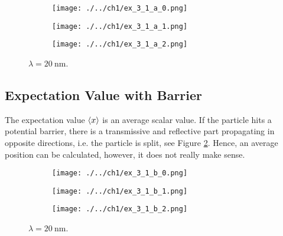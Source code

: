 \begin{figure}
	\centering
	\begin{subfigure}{1\linewidth}
		\texttt{[image: ./../ch1/ex\_3\_1\_a\_0.png]}
	\end{subfigure}
	
	\begin{subfigure}{1\linewidth}
		\texttt{[image: ./../ch1/ex\_3\_1\_a\_1.png]}
	\end{subfigure}
	
	\begin{subfigure}{1\linewidth}
		\texttt{[image: ./../ch1/ex\_3\_1\_a\_2.png]}
	\end{subfigure}
	
	\caption{$\lambda = \SI{20}{\nano\m}$.}
	\label{fig:ex_3_1_a}
\end{figure}

\clearpage



\subsection{Expectation Value with Barrier}

The expectation value $\braket{x}$ is an average scalar value.
If the particle hits a potential barrier, there is a transmissive
and reflective part propagating in opposite directions, i.e. the
particle is split, see Figure \ref{fig:ex_3_1_b}. Hence, an average
position can be calculated, however, it does not really make sense.

\begin{figure}
	\centering
	\begin{subfigure}{1\linewidth}
		\texttt{[image: ./../ch1/ex\_3\_1\_b\_0.png]}
	\end{subfigure}
	
	\begin{subfigure}{1\linewidth}
		\texttt{[image: ./../ch1/ex\_3\_1\_b\_1.png]}
	\end{subfigure}
	
	\begin{subfigure}{1\linewidth}
		\texttt{[image: ./../ch1/ex\_3\_1\_b\_2.png]}
	\end{subfigure}
	
	\caption{$\lambda = \SI{20}{\nano\m}$.}
	\label{fig:ex_3_1_b}
\end{figure}

